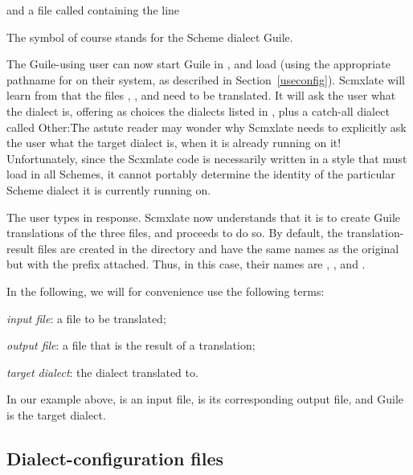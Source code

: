 
\n and a file called  containing
the line


\n The symbol  of course stands for the Scheme
dialect Guile.

The Guile-using user can now start Guile in ,
and load  (using the appropriate
pathname for  on their system, as
described in Section~\ref{useconfig}).  Scmxlate will learn
from  that the files
, , and  need to be
translated.  It will ask the user what the dialect is,
offering as choices the dialects listed in
, plus a catch-all
dialect called Other:\f{The astute reader may wonder
why Scmxlate needs to explicitly ask the user what the
target dialect is, when it is already running on it!
Unfortunately, since the Scxmlate code is necessarily
written in a style that must load in all Schemes, it
cannot portably determine the identity of the
particular Scheme dialect it is currently running on.}


The user types  in response.  Scmxlate now
understands that it is to create Guile translations of
the three files, and proceeds to do so.  By default,
the translation-result files are created in the
 directory and have the same names as the
original but with the prefix  attached.  Thus,
in this case, their names are ,
, and .

In the following, we will for convenience use
the following terms:

\item{\bull} {\em input file}: a file to be translated;
\item{\bull} {\em output file}: a file that is the result of
a translation;
\item{\bull} {\em target dialect}: the dialect translated to.

\n In our example above,  is an input
file,  is its corresponding output file,
and Guile is the target dialect.

\subsection{Dialect-configuration files}

